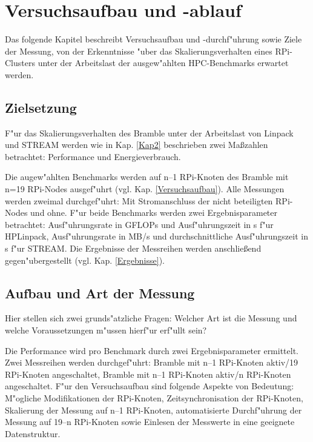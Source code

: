 \chapter{Versuchsaufbau und -ablauf}\label{Kap3}

Das folgende Kapitel beschreibt Versuchsaufbau und -durchf"uhrung sowie Ziele der Messung, von der Erkenntnisse "uber das Skalierungsverhalten eines RPi-Clusters unter der Arbeitslast der ausgew"ahlten HPC-Benchmarks erwartet werden. 

\section{Zielsetzung}\label{Ziel}

F"ur das Skalierungsverhalten des Bramble unter der Arbeitslast von Linpack und STREAM werden wie in Kap. \ref{Kap2} beschrieben zwei Ma\ss zahlen betrachtet: Performance und Energieverbrauch.

Die augew"ahlten Benchmarks werden auf n--1 RPi-Knoten des Bramble mit n=19 RPi-Nodes ausgef"uhrt (vgl. Kap. \ref{Versuchsaufbau}). Alle Messungen werden zweimal durchgef"uhrt: Mit Stromanschluss der nicht beteiligten RPi-Nodes und ohne. F"ur beide Benchmarks werden zwei Ergebnisparameter betrachtet: Ausf"uhrungsrate in GFLOPs und Ausf"uhrungszeit in s f"ur HPLinpack, Ausf"uhrungsrate in MB/s und durchschnittliche Ausf"uhrungszeit in s f"ur STREAM. Die Ergebnisse der Messreihen werden anschlie\ss end gegen"ubergestellt (vgl. Kap. \ref{Ergebnisse}). 

\section{Aufbau und Art der Messung}\label{Aufbau}

Hier stellen sich zwei grunds"atzliche Fragen: Welcher Art ist die Messung und welche Voraussetzungen m"ussen hierf"ur erf"ullt sein? 

Die Performance wird pro Benchmark durch zwei Ergebnisparameter ermittelt. Zwei Messreihen werden durchgef"uhrt: Bramble mit n--1 RPi-Knoten aktiv/19 RPi-Knoten angeschaltet, Bramble mit n--1 RPi-Knoten aktiv/n RPi-Knoten angeschaltet. 
F"ur den Versuchsaufbau sind folgende Aspekte von Bedeutung: M"ogliche Modifikationen der RPi-Knoten, Zeitsynchronisation der RPi-Knoten, Skalierung der Messung auf n--1 RPi-Knoten, automatisierte Durchf"uhrung der Messung auf 19--n RPi-Knoten sowie Einlesen der Messwerte in eine geeignete Datenstruktur. 

